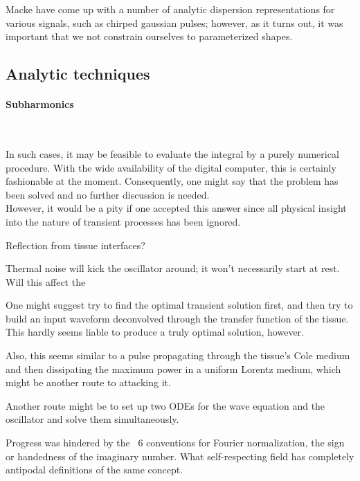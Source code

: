 \documentclass[paper.tex]{subfiles}
\begin{document}
Macke \cite{Simple2012} have come up with a number of analytic dispersion representations for various signals, such as chirped gaussian pulses; however, as it turns out, it was important that we not constrain ourselves to parameterized shapes.


\subsection{Analytic techniques}


\paragraph{\textbf{Subharmonics}}\


\begin{fquote}
	In such cases, it may be feasible to evaluate the integral by a purely numerical procedure. With the wide availability of the digital computer, this is certainly fashionable at the moment. Consequently, one might say that the problem has been solved and no further discussion is needed. \\
	
	However, it would be a pity if one accepted this answer since all physical insight into the nature of transient processes has been ignored. 
\end{fquote}



\begin{autem}
Reflection from tissue interfaces?

Thermal noise will kick the oscillator around; it won't necessarily start at rest. Will this affect the 
\end{autem}

One might suggest try to find the optimal transient solution first, and then try to build an input waveform deconvolved through the  transfer function of the tissue. This hardly seems liable to produce a truly optimal solution, however.


Also, this seems similar to a pulse propagating through the tissue's Cole medium and then dissipating the maximum power in a uniform Lorentz medium, which might be another route to attacking it.

Another route might be to set up two ODEs for the wave equation and the oscillator and solve them simultaneously.

Progress was hindered by the ~6 conventions for Fourier normalization, the sign or handedness of the imaginary number. What self-respecting field has completely antipodal definitions of the same concept.
\end{document}
